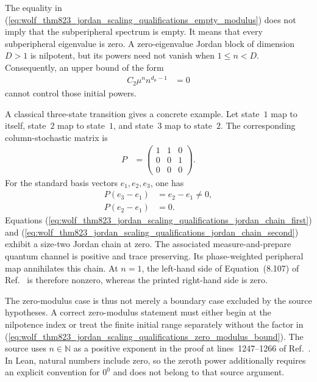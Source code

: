 \documentclass{article}
\begin{document}
The equality in
(\ref{eq:wolf_thm823_jordan_scaling_qualifications_empty_modulus}) does not
imply that the subperipheral spectrum is empty. It means that every
subperipheral eigenvalue is zero. A zero-eigenvalue Jordan block of dimension
$D>1$ is nilpotent, but its powers need not vanish when $1\leq n<D$.
Consequently, an upper bound of the form
\begin{align}
    C_2\mu^n n^{d_\mu-1}
        &= 0
    \label{eq:wolf_thm823_jordan_scaling_qualifications_zero_modulus_bound}
\end{align}
cannot control those initial powers.

A classical three-state transition gives a concrete example. Let state~$1$
map to itself, state~$2$ map to state~$1$, and state~$3$ map to state~$2$.
The corresponding column-stochastic matrix is
\begin{align}
    P
        &=
        \begin{pmatrix}
            1 & 1 & 0\\
            0 & 0 & 1\\
            0 & 0 & 0
        \end{pmatrix}.
    \label{eq:wolf_thm823_jordan_scaling_qualifications_transition_matrix}
\end{align}
For the standard basis vectors $e_1,e_2,e_3$, one has
\begin{align}
    P(e_3-e_1)
        &= e_2-e_1 \neq 0,
    \label{eq:wolf_thm823_jordan_scaling_qualifications_jordan_chain_first}\\
    P(e_2-e_1)
        &= 0.
    \label{eq:wolf_thm823_jordan_scaling_qualifications_jordan_chain_second}
\end{align}
Equations
(\ref{eq:wolf_thm823_jordan_scaling_qualifications_jordan_chain_first}) and
(\ref{eq:wolf_thm823_jordan_scaling_qualifications_jordan_chain_second})
exhibit a size-two Jordan chain at zero. The associated measure-and-prepare
quantum channel is positive and trace preserving. Its phase-weighted
peripheral map annihilates this chain. At $n=1$, the left-hand side of
Equation~(8.107) of Ref.~\cite{Wolf2012Quantum} is therefore nonzero, whereas
the printed right-hand side is zero.

The zero-modulus case is thus not merely a boundary case excluded by the
source hypotheses. A correct zero-modulus statement must either begin at the
nilpotence index or treat the finite initial range separately without the
factor in
(\ref{eq:wolf_thm823_jordan_scaling_qualifications_zero_modulus_bound}).
The source uses $n\in\mathbb N$ as a positive exponent in the proof at
lines~1247--1266 of Ref.~\cite{Wolf2012Quantum}. In Lean, natural numbers
include zero, so the zeroth power additionally requires an explicit convention
for $0^0$ and does not belong to that source argument.
\end{document}
